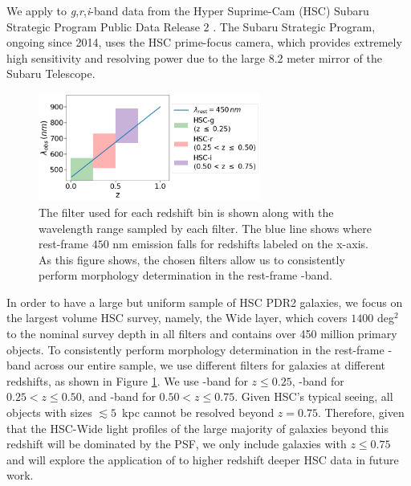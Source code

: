 We apply \gampen{} to \textit{g},\textit{r},\textit{i}-band data from the Hyper Suprime-Cam (HSC) Subaru Strategic Program Public Data Release 2 \citep[PDR2;][]{hsc_pdr2}. The Subaru Strategic Program, ongoing since 2014, uses the HSC prime-focus camera, which provides extremely high sensitivity and resolving power due to the large 8.2 meter mirror of the Subaru Telescope. 
\begin{figure}[htb]
    \centering
    \includegraphics[width = 0.65\textwidth]{data_lambda.png}
    \caption{
    The filter used for each redshift bin is shown along with the wavelength range sampled by each filter. The blue line shows where rest-frame $450$ nm emission falls for redshifts labeled on the x-axis. As this figure shows, the chosen filters allow us to consistently perform morphology determination in the rest-frame \gb{}-band.}
    \label{fig_c3:hsc_response}
\end{figure}

In order to have a large but uniform sample of HSC PDR2 galaxies, we focus on the largest volume HSC survey, namely, the Wide layer, which covers $1400$ deg$^2$ to the nominal survey depth in all filters and contains over 450 million primary objects. To consistently perform morphology determination in the rest-frame \gb-band across our entire sample, we use different filters for galaxies at different redshifts, as shown in Figure \ref{fig_c3:hsc_response}. We use \gb-band for $z\leq0.25$, \rb-band for $0.25<z\leq0.50$, and \ib-band for $0.50<z\leq0.75$. Given HSC's typical seeing, all objects with sizes $\lesssim5$\, kpc cannot be resolved beyond $z=0.75$. Therefore, given that the HSC-Wide light profiles of the large majority of galaxies beyond this redshift will be dominated by the PSF, we only include galaxies with $z\leq0.75$ and will explore the application of \gampen{} to higher redshift deeper HSC data in future work. 

